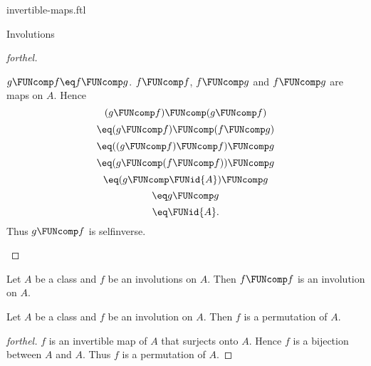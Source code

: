 \documentclass{naproche-library}
\begin{document}
\begin{smodule}[title=Invertible Maps]{invertible-maps.ftl}
\begin{sfragment}{Involutions}
\begin{proof}[forthel]
    \begin{case}{$g \FUNcomp f \eq f \FUNcomp g$.}
      $f \FUNcomp f$, $f \FUNcomp g$ and $f \FUNcomp g$ are maps on $A$.
      Hence
      \[  (g \FUNcomp f) \FUNcomp (g \FUNcomp f)       \]
      \[    \eq (g \FUNcomp f) \FUNcomp (f \FUNcomp g)   \]
      \[    \eq ((g \FUNcomp f) \FUNcomp f) \FUNcomp g   \]
      \[    \eq (g \FUNcomp (f \FUNcomp f)) \FUNcomp g   \]
      \[    \eq (g \FUNcomp \FUNid{A}) \FUNcomp g       \]
      \[    \eq g \FUNcomp g                       \]
      \[    \eq \FUNid{A}.                        \]
      Thus $g \FUNcomp f$ is selfinverse.
    \end{case}
  \end{proof}

  \begin{corollary}[forthel,id=FOUNDATIONS_09_5958206868160512]
    Let $A$ be a class and $f$ be an involutions on $A$.
    Then $f \FUNcomp f$ is an involution on $A$.
  \end{corollary}

  \begin{proposition}[forthel,id=FOUNDATIONS_09_2314262743613440]
    Let $A$ be a class and $f$ be an involution on $A$.
    Then $f$ is a permutation of $A$.
  \end{proposition}
  \begin{proof}[forthel]
    $f$ is an invertible map of $A$ that surjects onto $A$.
    Hence $f$ is a bijection between $A$ and $A$.
    Thus $f$ is a permutation of $A$.
  \end{proof}
\end{sfragment}
\end{smodule}
\end{document}
